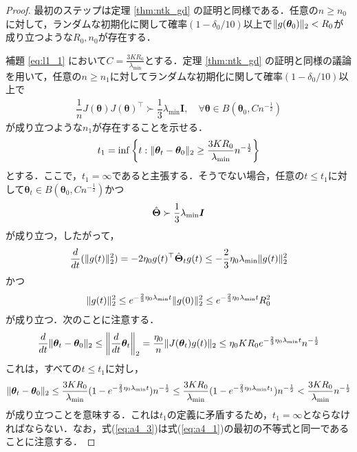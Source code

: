 \begin{proof}
    最初のステップは定理 \ref{thm:ntk_gd} の証明と同様である．任意の$n \geq n_0$に対して，ランダムな初期化に関して確率$(1- \delta_0 / 10)$以上で$\|g(\bm{\theta}_0)\|_2 < R_0$が成り立つような$R_0, n_0$が存在する．

    補題 \ref{eq:l1_1} において$C=\frac{3KR_0}{\lambda_{\min}}$とする．定理 \ref{thm:ntk_gd} の証明と同様の議論を用いて，任意の$n \geq n_1$に対してランダムな初期化に関して確率$(1- \delta_0 / 10)$以上で
    \begin{align}
        \dfrac{1}{n}J(\bm{\theta})J(\bm{\theta})^\top \succ \dfrac{1}{3}\lambda_{\min}\bm{I}, \quad \forall \bm{\theta} \in B(\bm{\theta}_0, Cn^{-\frac{1}{2}})
    \end{align}
    が成り立つような$n_1$が存在することを示せる．
    \begin{align}
        t_1 = \inf\left\{t:\|\bm{\theta}_t - \bm{\theta}_0\|_2 \geq \dfrac{3KR_0}{\lambda_{\min}}n^{-\frac{1}{2}}\right\}
    \end{align}
    とする．ここで，$t_1 = \infty$であると主張する．そうでない場合，任意の$t \leq t_1$に対して$\bm{\theta}_t \in B(\bm{\theta}_0, Cn^{-\frac{1}{2}})$かつ
    \begin{align}
        \hat{\bm{\Theta}} \succ \dfrac{1}{3}\lambda_{\min}\bm{I}
    \end{align}
    が成り立つ，したがって，
    \begin{align}
        \dfrac{d}{dt}(\|g(t)\|_2^2) = -2\eta_0 g(t)^\top \hat{\bm{\Theta}}_t g(t) \leq -\dfrac{2}{3}\eta_0 \lambda_{\min}\|g(t)\|_2^2
    \end{align}
    かつ
    \begin{align}
        \label{eq:a4_3}
        \|g(t)\|_2^2 \leq e^{-\frac{2}{3}\eta_0 \lambda_{\min}t}\|g(0)\|_2^2 \leq e^{-\frac{2}{3}\eta_0 \lambda_{\min}t} R_0^2
    \end{align}
    が成り立つ．次のことに注意する．
    \begin{align}
        \dfrac{d}{dt}\|\bm{\theta}_t - \bm{\theta}_0\|_2 \leq \left\|\dfrac{d}{dt}\bm{\theta}_t\right\|_2 = \dfrac{\eta_0}{n}\|J(\bm{\theta}_t)g(t)\|_2 \leq \eta_0 K R_0e^{-\frac{2}{3}\eta_0 \lambda_{\min}t}n^{-\frac{1}{2}}
    \end{align}
    これは，すべての$t \leq t_1$に対し，
    \begin{align}
        \|\bm{\theta}_t - \bm{\theta}_0\|_2 \leq \dfrac{3KR_0}{\lambda_{\min}}(1 - e^{-\frac{2}{3}\eta_0 \lambda_{\min}t})n^{-\frac{1}{2}} \leq \dfrac{3KR_0}{\lambda_{\min}}(1 - e^{-\frac{2}{3}\eta_0 \lambda_{\min}t_1})n^{-\frac{1}{2}} < \dfrac{3KR_0}{\lambda_{\min}}n^{-\frac{1}{2}}
    \end{align}
    が成り立つことを意味する．これは$t_1$の定義に矛盾するため，$t_1 = \infty$とならなければならない．なお，式(\ref{eq:a4_3})は式(\ref{eq:a4_1})の最初の不等式と同一であることに注意する．
\end{proof}